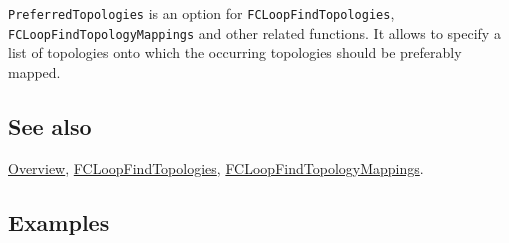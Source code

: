 \documentclass[../FeynCalcManual.tex]{subfiles}
\begin{document}
\texttt{PreferredTopologies} is an option for
\texttt{FCLoopFindTopologies}, \texttt{FCLoopFindTopologyMappings} and
other related functions. It allows to specify a list of topologies onto
which the occurring topologies should be preferably mapped.

\subsection{See also}

\hyperlink{toc}{Overview},
\hyperlink{fcloopfindtopologies}{FCLoopFindTopologies},
\hyperlink{fcloopfindtopologymappings}{FCLoopFindTopologyMappings}.

\subsection{Examples}
\end{document}
